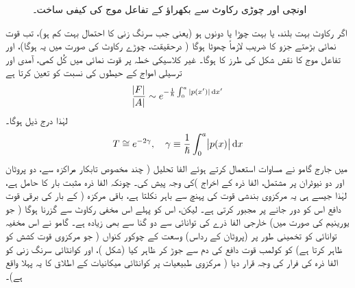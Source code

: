 \begin{figure}
\centering
{}
\caption{اونچی اور چوڑی رکاوٹ سے بکھراؤ کے تفاعل موج کی کیفی ساخت۔}
\label{شکل_وکب_اونچی_چوڑی}
\end{figure}


اگر رکاوٹ بہت بلند، یا بہت چوڑا یا دونوں ہو (یعنی جب سرنگ زنی کا احتمال بہت کم ہو)، تب قوت نمائی بڑھتے جزو کا  ضریب   لازماً چھوٹا ہوگا ( درحقیقت، چوڑے رکاوٹ کی صورت میں یہ ہوگا)، اور تفاعل موج کا نقش شکل  کی طرز کا ہوگا۔ غیر کلاسیکی خطہ پر قوت نمائی میں کُل کمی، آمدی اور ترسیلی امواج کے حیطوں کی نسبت کو تعین کرتا ہے 
\begin{align*}
	\frac{\abs{F}}{\abs{A}}\sim e^{-\frac{1}{\hslash}\int^{a}_{0}| p(x') |\dif x'}
\end{align*}
 لہٰذا درج ذیل ہوگا۔
\begin{align}\label{مساوات_وقب_ترسیلی_حیطہ}
	T\cong e^{-2\gamma}, \quad \gamma\equiv\frac{1}{\hslash}\int^{a}_{0}\abs{p(x)}\dif x
\end{align}
  میں جارج گامو نے مساوات  استعمال کرتے ہوئے الفا تحلیل ( چند مخصوص تابکار مراکزہ سے، دو پروٹان اور دو نیوٹران پر مشتمل، الفا ذرہ کے اخراج )کی وجہ پیش کی۔ چونکہ الفا ذرہ مثبت بار  کا حامل ہے، لہٰذا جیسے ہی یہ مرکزوی بندشی قوت کی پہنچ سے باہر نکلتا ہے، باقی مرکزہ ( کے بار کی برقی قوت دافع اس کو دور جانے پر مجبور کرتی ہے۔ لیکن، اس کو پہلے اس مخفی رکاوٹ سے گزرنا ہوگا ( جو یورینیم کی صورت میں) خارجی الفا ذرے کی توانائی سے دو گنا سے بھی زیادہ ہے۔ گامو نے اس مخفیہ توانائی کو تخمینی طور پر (پروٹان کے رداس)  وسعت کے چوکور کنواں ( جو مرکزوی قوت کشش کو ظاہر کرتا ہے) کو کولمب قوت دافع کی دم سے جوڑ کر ظاہر کیا (شکل )، اور کوانٹائی سرنگ زنی کو الفا ذرہ کی فرار کی وجہ قرار دیا ( مرکزوی طبیعیات پر کوانٹائی میکانیات کے اطلاق کا یہ پہلا واقع ہے)۔

